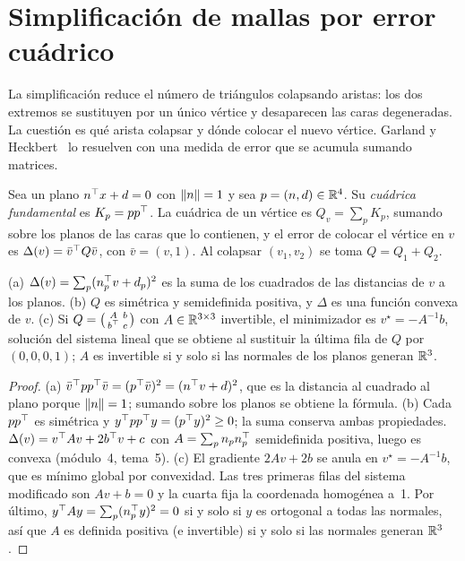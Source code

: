 \section{Simplificación de mallas por error cuádrico}

La simplificación reduce el número de triángulos colapsando aristas: los dos extremos se sustituyen por un único vértice y desaparecen las caras degeneradas. La cuestión es qué arista colapsar y dónde colocar el nuevo vértice. Garland y Heckbert~\cite{garland} lo resuelven con una medida de error que se acumula sumando matrices.

\begin{definicion}\label{def:cuadrica}
Sea un plano $n^\top x+d=0$ con $\lVert n\rVert=1$ y sea $p=(n,d)\in\mathbb{R}^4$. Su \emph{cuádrica fundamental} es $K_p=pp^\top$. La cuádrica de un vértice es $Q_v=\sum_pK_p$, sumando sobre los planos de las caras que lo contienen, y el error de colocar el vértice en $v$ es $\Delta(v)=\bar v^\top Q\bar v$, con $\bar v=(v,1)$. Al colapsar $(v_1,v_2)$ se toma $Q=Q_1+Q_2$.
\end{definicion}

\begin{proposicion}\label{prop:qem}
(a) $\Delta(v)=\sum_p(n_p^\top v+d_p)^2$ es la suma de los cuadrados de las distancias de $v$ a los planos. (b) $Q$ es simétrica y semidefinida positiva, y $\Delta$ es una función convexa de $v$. (c) Si $Q=\begin{psmallmatrix}A&b\\b^\top&c\end{psmallmatrix}$ con $A\in\mathbb{R}^{3\times3}$ invertible, el minimizador es $v^\star=-A^{-1}b$, solución del sistema lineal que se obtiene al sustituir la última fila de $Q$ por $(0,0,0,1)$; $A$ es invertible si y solo si las normales de los planos generan $\mathbb{R}^3$.
\end{proposicion}

\begin{proof}
(a) $\bar v^\top pp^\top\bar v=(p^\top\bar v)^2=(n^\top v+d)^2$, que es la distancia al cuadrado al plano porque $\lVert n\rVert=1$; sumando sobre los planos se obtiene la fórmula. (b) Cada $pp^\top$ es simétrica y $y^\top pp^\top y=(p^\top y)^2\ge 0$; la suma conserva ambas propiedades. $\Delta(v)=v^\top Av+2b^\top v+c$ con $A=\sum_pn_pn_p^\top$ semidefinida positiva, luego es convexa (módulo~4, tema~5). (c) El gradiente $2Av+2b$ se anula en $v^\star=-A^{-1}b$, que es mínimo global por convexidad. Las tres primeras filas del sistema modificado son $Av+b=0$ y la cuarta fija la coordenada homogénea a~1. Por último, $y^\top Ay=\sum_p(n_p^\top y)^2=0$ si y solo si $y$ es ortogonal a todas las normales, así que $A$ es definida positiva (e invertible) si y solo si las normales generan $\mathbb{R}^3$.
\end{proof}

